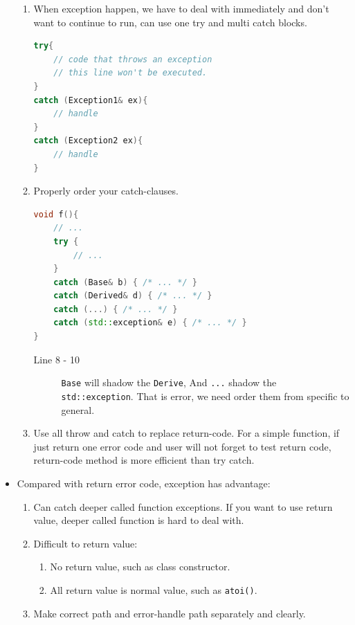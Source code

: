 \documentclass[a4paper,11pt,twoside]{book}
\begin{document}
\begin{itemize}
\begin{enumerate}
	\item When exception happen, we have to deal with immediately and don't want to continue to run, can use one try and multi catch blocks. 
\begin{lstlisting}[frame=single, language=c++]
try{ 
	// code that throws an exception	
	// this line won't be executed. 
}
catch (Exception1& ex){
	// handle
}
catch (Exception2 ex){
	// handle
}			
\end{lstlisting}	
	
	
	\item Properly order your catch-clauses.
\begin{lstlisting}[frame=single, language=c++]
void f(){
	// ...
	try {
		// ...
	}
	catch (Base& b) { /* ... */ }
	catch (Derived& d) { /* ... */ }
	catch (...) { /* ... */ }
	catch (std::exception& e) { /* ... */ }
}
\end{lstlisting}	
\begin{description}
	\item[Line 8 - 10] \texttt{Base} will shadow the \texttt{Derive}, And \texttt{...} shadow the \texttt{std::exception}. That is error, we need order them from specific to general. 
\end{description}

	\item Use all throw and catch to replace return-code. For a simple function, if just return one error code and user will not forget to test return code, return-code method is more efficient than try catch. 
\end{enumerate}
	
	\item Compared with return error code, exception has advantage:
	\begin{enumerate}
		\item  Can catch deeper called function exceptions. If you want to use return value, deeper called function is hard to deal with.
		
		\item Difficult to return value: 
		\begin{enumerate}
			\item No return value, such as class constructor.
			\item All return value is normal value, such as \texttt{atoi()}.
		\end{enumerate}
		
		\item Make correct path and error-handle path separately and clearly.
		

\end{enumerate}
\end{itemize}
\end{document}
